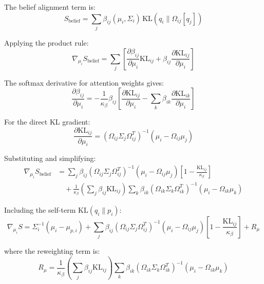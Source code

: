 \documentclass[11pt]{article}
\begin{document}
The belief alignment term is:
\begin{equation}
S_{\mathrm{belief}} = \sum_j \beta_{ij}(\mu_i, \Sigma_i) \, \mathrm{KL}(q_i \| \Omega_{ij}[q_j])
\end{equation}

Applying the product rule:
\begin{equation}
\nabla_{\mu_i} S_{\mathrm{belief}} = \sum_j \left[ \frac{\partial \beta_{ij}}{\partial \mu_i} \mathrm{KL}_{ij} + \beta_{ij} \frac{\partial \mathrm{KL}_{ij}}{\partial \mu_i} \right]
\end{equation}

The softmax derivative for attention weights gives:
\begin{equation}
\frac{\partial \beta_{ij}}{\partial \mu_i} = -\frac{1}{\kappa_\beta} \beta_{ij} \left[\frac{\partial \mathrm{KL}_{ij}}{\partial \mu_i} - \sum_k \beta_{ik} \frac{\partial \mathrm{KL}_{ik}}{\partial \mu_i}\right]
\end{equation}

For the direct KL gradient:
\begin{equation}
\frac{\partial \mathrm{KL}_{ij}}{\partial \mu_i} = (\Omega_{ij}\Sigma_j\Omega_{ij}^T)^{-1}(\mu_i - \Omega_{ij}\mu_j)
\end{equation}

Substituting and simplifying:
\begin{align}
\nabla_{\mu_i} S_{\mathrm{belief}} &= \sum_j \beta_{ij} (\Omega_{ij}\Sigma_j\Omega_{ij}^T)^{-1}(\mu_i - \Omega_{ij}\mu_j) \left[1 - \frac{\mathrm{KL}_{ij}}{\kappa_\beta}\right] \nonumber \\
&\quad + \frac{1}{\kappa_\beta}\left(\sum_j \beta_{ij}\mathrm{KL}_{ij}\right) \sum_k \beta_{ik} (\Omega_{ik}\Sigma_k\Omega_{ik}^T)^{-1}(\mu_i - \Omega_{ik}\mu_k)
\end{align}

Including the self-term $\mathrm{KL}(q_i \| p_i)$:
\begin{equation}
\boxed{\nabla_{\mu_i} S = \Sigma_i^{-1}(\mu_i - \mu_{p,i}) + \sum_j \beta_{ij} (\Omega_{ij}\Sigma_j\Omega_{ij}^T)^{-1}(\mu_i - \Omega_{ij}\mu_j) \left[1 - \frac{\mathrm{KL}_{ij}}{\kappa_\beta}\right] + R_\mu}
\end{equation}

where the reweighting term is:
\begin{equation}
R_\mu = \frac{1}{\kappa_\beta}\left(\sum_j \beta_{ij}\mathrm{KL}_{ij}\right) \sum_k \beta_{ik} (\Omega_{ik}\Sigma_k\Omega_{ik}^T)^{-1}(\mu_i - \Omega_{ik}\mu_k)
\end{equation}
\end{document}

